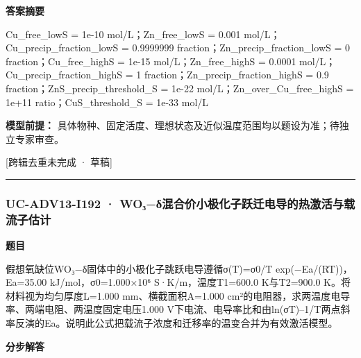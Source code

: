 \documentclass[UTF8,11pt,a4paper]{ctexart}
\begin{document}
\noindent\textbf{答案摘要}\par
Cu\_free\_lowS = 1e-10 mol/L；Zn\_free\_lowS = 0.001 mol/L；Cu\_precip\_fraction\_lowS = 0.9999999 fraction；Zn\_precip\_fraction\_lowS = 0 fraction；Cu\_free\_highS = 1e-15 mol/L；Zn\_free\_highS = 0.0001 mol/L；Cu\_precip\_fraction\_highS = 1 fraction；Zn\_precip\_fraction\_highS = 0.9 fraction；ZnS\_precip\_threshold\_S = 1e-22 mol/L；Zn\_over\_Cu\_free\_highS = 1e+11 ratio；CuS\_threshold\_S = 1e-33 mol/L\par
\noindent\textbf{模型前提：}
具体物种、固定活度、理想状态及近似温度范围均以题设为准；待独立专家审查。\par
\noindent\textcolor{red!65!black}{[跨辑去重未完成 · 草稿]} \par
\medskip\hrule\medskip
{}
\subsubsection*{UC-ADV13-I192 · WO₃−δ混合价小极化子跃迁电导的热激活与载流子估计}
\noindent\textbf{题目}\par
假想氧缺位WO₃−δ固体中的小极化子跳跃电导遵循σ(T)=σ0/T exp(−Ea/(RT))，Ea=35.00 kJ/mol，σ0=1.000×10⁶ S·K/m，温度T1=600.0 K与T2=900.0 K。将材料视为均匀厚度L=1.000 mm、横截面积A=1.000 cm²的电阻器，求两温度电导率、两端电阻、两温度固定电压1.000 V下电流、电导率比和由ln(σT)–1/T两点斜率反演的Ea。说明此公式把载流子浓度和迁移率的温变合并为有效激活模型。\par
\medskip\noindent\textbf{分步解答}
\end{document}

